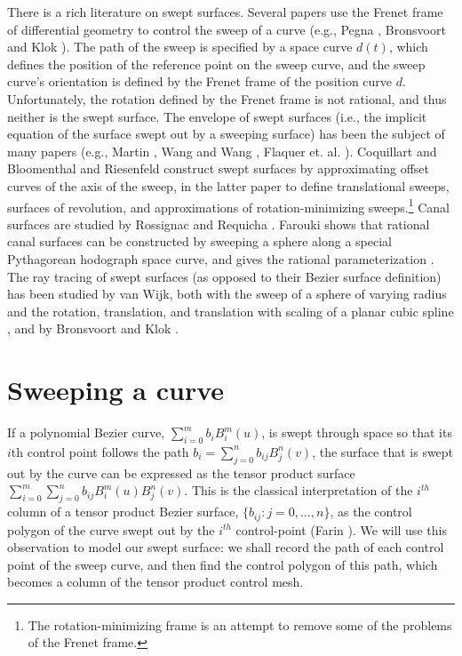 There is a rich literature on swept surfaces.
Several papers use the Frenet frame of differential geometry
to control the sweep of a curve (e.g., Pegna \cite{pegna88},
Bronsvoort and Klok \cite{bronsklok85}).
The path of the sweep is specified by a space curve $d(t)$,
which defines the position of the reference point on the
sweep curve, and the sweep curve's orientation is defined by
the Frenet frame of the position curve $d$.
Unfortunately, the rotation defined by the Frenet frame is not rational,
and thus neither is the swept surface.  %
The envelope of swept surfaces (i.e., the implicit equation of the surface
swept out by a sweeping surface) has been the subject of many papers
(e.g., Martin \cite{martinsteph90}, Wang and Wang \cite{wangwang86},
Flaquer et. al. \cite{flaquer92}).
Coquillart \cite{coquillart87} and Bloomenthal and Riesenfeld 
\cite{bloom91} construct swept surfaces by approximating offset curves
of the axis of the sweep, in the latter paper to define translational sweeps,
surfaces of revolution, and approximations of rotation-minimizing 
sweeps.\footnote{The rotation-minimizing frame 
        is an attempt to remove some of the problems of the Frenet frame.}
Canal surfaces are studied by Rossignac and Requicha 
\cite{rossrequicha84,rossignac85}.
Farouki shows that rational canal surfaces can be constructed by sweeping
a sphere along a special Pythagorean hodograph space curve, and gives the
rational parameterization \cite{farouki94}.
The ray tracing of swept surfaces (as opposed to their Bezier surface 
definition) has been studied by van Wijk, both with the sweep of a sphere
of varying radius \cite{vanwijk84euro} and the rotation, translation,
and translation with scaling of a planar cubic spline \cite{vanwijk84tog},
and by Bronsvoort and Klok \cite{bronsklok85}.

\section{Sweeping a curve}
\label{sec:theory}

If a polynomial Bezier curve, $\sum_{i=0}^{m} b_i B_{i}^{m}(u)$,
is swept through space so that its $i$th control point follows the path 
$b_i = \sum_{j=0}^{n} b_{ij} B_{j}^{n}(v)$,
the surface that is swept out by the curve
can be expressed as the tensor product surface 
$\sum_{i=0}^{m} \sum_{j=0}^{n} b_{ij} B_{i}^{m}(u) B_{j}^{n}(v)$.
This is the classical interpretation of the $i^{th}$ column of a tensor
product Bezier surface, $\{b_{ij}: j=0,\ldots,n\}$, 
as the control polygon of the curve swept out by the $i^{th}$ control-point
(Farin \cite{farin93}).
We will use this observation to model our swept surface:
we shall record the path of each control point of the
sweep curve, and then find the control polygon
of this path, which becomes a column of the tensor product control mesh.

